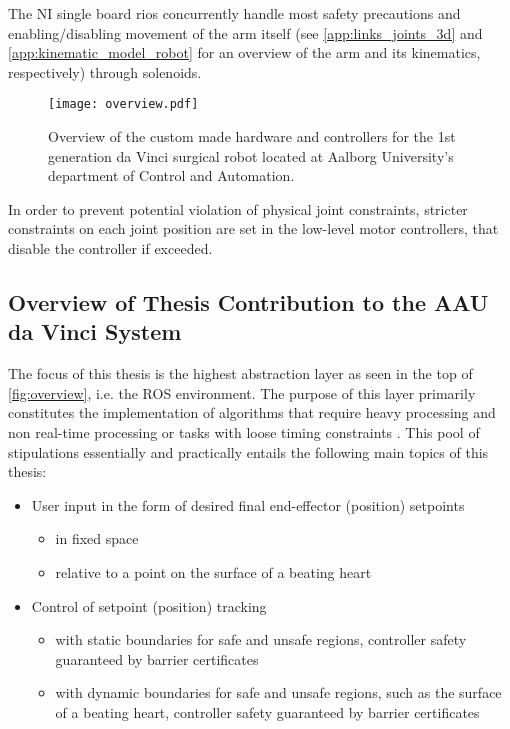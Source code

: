 The NI single board \glspl{rio} concurrently handle most safety precautions and enabling/disabling movement of the arm itself (see \autoref{app:links_joints_3d} and \ref{app:kinematic_model_robot} for an overview of the arm and its kinematics, respectively) through solenoids.
\begin{figure}[H]
\hspace*{-5mm}
\texttt{[image: overview.pdf]}	
\caption{Overview of the custom made hardware and controllers for the 1st generation da Vinci surgical robot located at Aalborg University's department of Control and Automation.}
\label{fig:overview}
\end{figure}

In order to prevent potential violation of physical joint constraints, stricter constraints on each joint position are set in the low-level motor controllers, that disable the controller if exceeded.


\subsection{Overview of Thesis Contribution to the AAU da Vinci System}\label{sec:project_overview}
The focus of this thesis is the highest abstraction layer as seen in the top of \autoref{fig:overview}, i.e. the ROS environment. The purpose of this layer primarily constitutes the implementation of algorithms that require heavy processing and non real-time processing or tasks with loose timing constraints \citep{bib:robot_paper}.
This pool of stipulations essentially and practically entails the following main topics of this thesis:
\begin{itemize}
\itemsep-1.3mm
	\item User input in the form of desired final end-effector (position) setpoints
	\begin{itemize}
		\vspace*{-1mm}
		\item in fixed space
		\item relative to a point on the surface of a beating heart
	\end{itemize}
	\item Control of setpoint (position) tracking 
	\begin{itemize}
		\vspace*{-1mm}
		\item with static boundaries for safe and unsafe regions, controller safety guaranteed by barrier certificates
		\item with dynamic boundaries for safe and unsafe regions,  such as the surface of a beating heart, controller safety guaranteed by barrier certificates
	\end{itemize}
\end{itemize}



